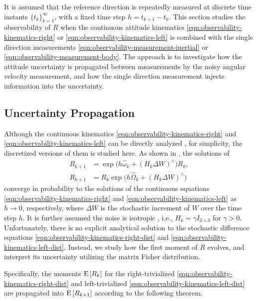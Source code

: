 It is assumed that the reference direction is repeatedly measured at discrete time instants $\{t_k\}_{k=1}^\infty$, with a fixed time step $h = t_{k+1}-t_k$.
This section studies the observability of $R$ when the continuous attitude kinematics \eqref{eqn:observability-kinematics-right} or \eqref{eqn:observability-kinematics-left} is combined with the single direction measurements \eqref{eqn:observability-measurement-inertial} or \eqref{eqn:observability-measurement-body}.
The approach is to investigate how the attitude uncertainty is propagated between measurements by the noisy angular velocity measurement, and how the single direction measurement injects information into the uncertainty.

\subsection{Uncertainty Propagation} \label{section:observability-propagation}

Although the continuous kinematics \eqref{eqn:observability-kinematics-right} and \eqref{eqn:observability-kinematics-left} can be directly analyzed \cite{wang2020observability}, for simplicity, the discretized versions of them is studied here.
As shown in \cite{barrau2018stochastic}, the solutions of
\begin{align}
	R_{k+1} &= \exp\!\big( h\hat{\omega}_k + (H_k\Delta W)^\wedge \big) R_k \label{eqn:observability-kinematics-right-dist}, \\
	R_{k+1} &= R_k \exp\!\big( h\hat{\Omega}_k + (H_k\Delta W)^\wedge \big) \label{eqn:observability-kinematics-left-dist}
\end{align}
converge in probability to the solutions of the continuous equations \eqref{eqn:observability-kinematics-right} and \eqref{eqn:observability-kinematics-left} as $h\to 0$, respectively, where $\Delta W$ is the stochastic increment of $W$ over the time step $h$.
It is further assumed the noise is isotropic \cite{barrau2018stochastic}, i.e., $H_k = \gamma I_{3\times 3}$ for $\gamma >0$.
Unfortunately, there is no explicit analytical solution to the stochastic difference equations \eqref{eqn:observability-kinematics-right-dist} and \eqref{eqn:observability-kinematics-left-dist}.
Instead, we study how the first moment of $R$ evolves, and interpret its uncertainty utilizing the matrix Fisher distribution.

Specifically, the moments $\mathrm{E}\left[ R_k \right]$ for the right-trivialized \eqref{eqn:observability-kinematics-right-dist} and left-trivialized \eqref{eqn:observability-kinematics-left-dist} are propagated into $\mathrm{E}\left[ R_{k+1} \right]$ according to the following theorem.

